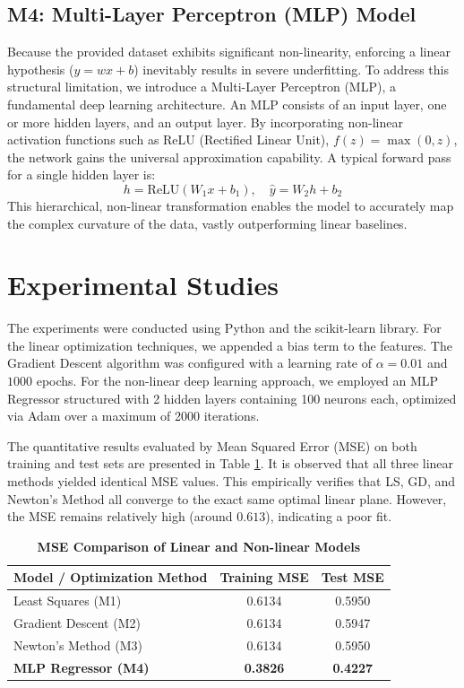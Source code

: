 \documentclass[12pt,a4paper]{article}
\begin{document}
\subsection*{M4: Multi-Layer Perceptron (MLP) Model}
Because the provided dataset exhibits significant non-linearity, enforcing a linear hypothesis ($y = wx + b$) inevitably results in severe underfitting. To address this structural limitation, we introduce a Multi-Layer Perceptron (MLP), a fundamental deep learning architecture. 
An MLP consists of an input layer, one or more hidden layers, and an output layer. By incorporating non-linear activation functions such as ReLU (Rectified Linear Unit), $f(z) = \max(0, z)$, the network gains the universal approximation capability. A typical forward pass for a single hidden layer is:
\begin{equation}
    h = \text{ReLU}(W_1 x + b_1), \quad \hat{y} = W_2 h + b_2
\end{equation}
This hierarchical, non-linear transformation enables the model to accurately map the complex curvature of the data, vastly outperforming linear baselines.

\section*{Experimental Studies}
The experiments were conducted using Python and the scikit-learn library. For the linear optimization techniques, we appended a bias term to the features. The Gradient Descent algorithm was configured with a learning rate of $\alpha = 0.01$ and $1000$ epochs. For the non-linear deep learning approach, we employed an MLP Regressor structured with 2 hidden layers containing 100 neurons each, optimized via Adam over a maximum of 2000 iterations.

The quantitative results evaluated by Mean Squared Error (MSE) on both training and test sets are presented in Table \ref{tab:1}. It is observed that all three linear methods yielded identical MSE values. This empirically verifies that LS, GD, and Newton's Method all converge to the exact same optimal linear plane. However, the MSE remains relatively high (around $0.613$), indicating a poor fit.

\begin{table}[H] 
    \centering 
    \caption{\textbf{MSE Comparison of Linear and Non-linear Models}} 
    \begin{tabular}{lcc} 
        \toprule 
        \textbf{Model / Optimization Method} & \textbf{Training MSE} & \textbf{Test MSE} \\
        \midrule 
        Least Squares (M1) & 0.6134 & 0.5950 \\
        Gradient Descent (M2) & 0.6134 & 0.5947 \\
        Newton's Method (M3) & 0.6134 & 0.5950 \\
        \textbf{MLP Regressor (M4)} & \textbf{0.3826} & \textbf{0.4227} \\
        \bottomrule 
    \end{tabular}
    \label{tab:1} 
\end{table}
\end{document}
